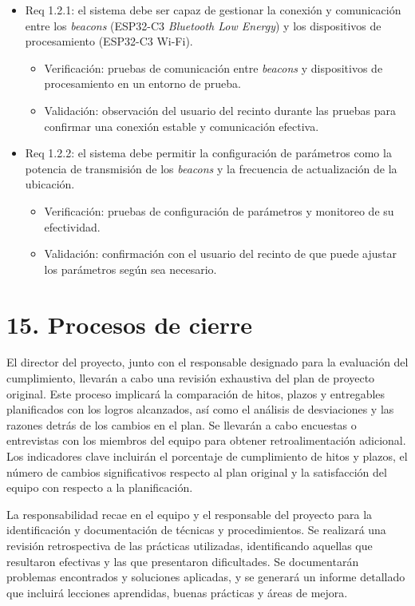 \documentclass[
11pt, %
]{charter}
\begin{document}
\begin{itemize}
\item Req 1.2.1: el sistema debe ser capaz de gestionar la conexión y comunicación entre los \textit{beacons} (ESP32-C3 \textit{Bluetooth Low Energy}) y los dispositivos de procesamiento (ESP32-C3 Wi-Fi).

\begin{itemize}
	\item Verificación: pruebas de comunicación entre \textit{beacons} y dispositivos de procesamiento en un entorno de prueba.
	\item Validación: observación del usuario del recinto durante las pruebas para confirmar una conexión estable y comunicación efectiva.
\end{itemize}

\item Req 1.2.2: el sistema debe permitir la configuración de parámetros como la potencia de transmisión de los \textit{beacons} y la frecuencia de actualización de la ubicación.

\begin{itemize}
	\item Verificación: pruebas de configuración de parámetros y monitoreo de su efectividad.
	\item Validación: confirmación con el usuario del recinto de que puede ajustar los parámetros según sea necesario.
\end{itemize}
\end{itemize}

\section{15. Procesos de cierre}    
\label{sec:cierre}

El director del proyecto, junto con el responsable designado para la evaluación del cumplimiento, llevarán a cabo una revisión exhaustiva del plan de proyecto original. Este proceso implicará la comparación de hitos, plazos y entregables planificados con los logros alcanzados, así como el análisis de desviaciones y las razones detrás de los cambios en el plan. Se llevarán a cabo encuestas o entrevistas con los miembros del equipo para obtener retroalimentación adicional. Los indicadores clave incluirán el porcentaje de cumplimiento de hitos y plazos, el número de cambios significativos respecto al plan original y la satisfacción del equipo con respecto a la planificación.

La responsabilidad recae en el equipo y el responsable del proyecto para la identificación y documentación de técnicas y procedimientos. Se realizará una revisión retrospectiva de las prácticas utilizadas, identificando aquellas que resultaron efectivas y las que presentaron dificultades. Se documentarán problemas encontrados y soluciones aplicadas, y se generará un informe detallado que incluirá lecciones aprendidas, buenas prácticas y áreas de mejora.
\end{document}
